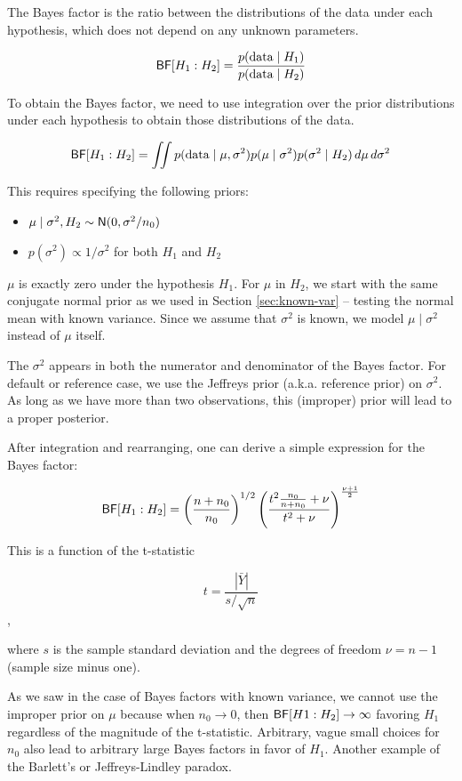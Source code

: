 \documentclass[]{book}
\providecommand{\tightlist}{%
  \setlength{\itemsep}{0pt}\setlength{\parskip}{0pt}}
\theoremstyle{definition}
\theoremstyle{definition}
\theoremstyle{definition}
\theoremstyle{remark}
\begin{document}
The Bayes factor is the ratio between the distributions of the data
under each hypothesis, which does not depend on any unknown parameters.

\[\textsf{BF}[H_1 : H_2] = \frac{p(\text{data} \mid H_1)} {p(\text{data} \mid H_2)}\]

To obtain the Bayes factor, we need to use integration over the prior
distributions under each hypothesis to obtain those distributions of the
data.

\[\textsf{BF}[H_1 : H_2] = \iint p(\text{data} \mid \mu, \sigma^2) p(\mu \mid \sigma^2) p(\sigma^2 \mid H_2)\, d \mu \, d\sigma^2\]

This requires specifying the following priors:

\begin{itemize}
\tightlist
\item
  \(\mu \mid \sigma^2, H_2 \sim \textsf{N}(0, \sigma^2/n_0)\)
\item
  \(p(\sigma^2) \propto 1/\sigma^2\) for both \(H_1\) and \(H_2\)
\end{itemize}

\(\mu\) is exactly zero under the hypothesis \(H_1\). For \(\mu\) in
\(H_2\), we start with the same conjugate normal prior as we used in
Section \ref{sec:known-var} -- testing the normal mean with known
variance. Since we assume that \(\sigma^2\) is known, we model
\(\mu \mid \sigma^2\) instead of \(\mu\) itself.

The \(\sigma^2\) appears in both the numerator and denominator of the
Bayes factor. For default or reference case, we use the Jeffreys prior
(a.k.a. reference prior) on \(\sigma^2\). As long as we have more than
two observations, this (improper) prior will lead to a proper posterior.

After integration and rearranging, one can derive a simple expression
for the Bayes factor:

\[\textsf{BF}[H_1 : H_2] = \left(\frac{n + n_0}{n_0} \right)^{1/2} \left(
  \frac{ t^2  \frac{n_0}{n + n_0} + \nu }
  { t^2  + \nu} \right)^{\frac{\nu + 1}{2}}\]

This is a function of the t-statistic

\[t = \frac{|\bar{Y}|}{s/\sqrt{n}}\],

where \(s\) is the sample standard deviation and the degrees of freedom
\(\nu = n-1\) (sample size minus one).

As we saw in the case of Bayes factors with known variance, we cannot
use the improper prior on \(\mu\) because when \(n_0 \to 0\), then
\(\textsf{BF}[H1:H_2] \to \infty\) favoring \(H_1\) regardless of the magnitude
of the t-statistic. Arbitrary, vague small choices for \(n_0\) also lead
to arbitrary large Bayes factors in favor of \(H_1\). Another example of
the Barlett's or Jeffreys-Lindley paradox.
\end{document}
